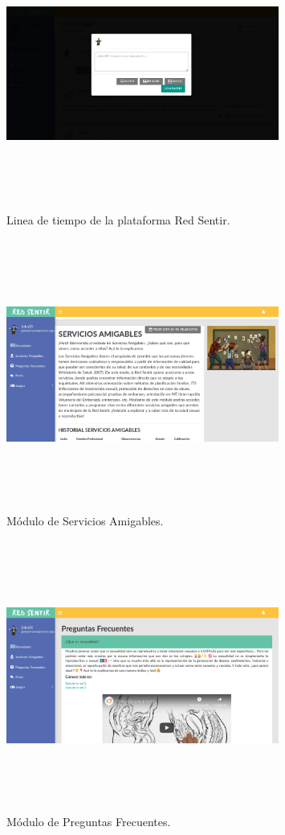 \documentclass[a4paper]{article}
\begin{document}
\begin{figure}[t]
\centering
\includegraphics[width=0.8\textwidth,height=3.5in]{novedades.png}
\caption{Linea de tiempo de la plataforma Red Sentir.}
\label{fig:novedades}
\end{figure}

\begin{figure}[t]
\centering
\includegraphics[width=0.8\textwidth,height=3.5in]{SA.png}
\caption{Módulo de Servicios Amigables.}
\label{fig:SA}
\end{figure}

\begin{figure}[t]
\centering
\includegraphics[width=0.8\textwidth,height=3.5in]{FAQ.png}
\caption{Módulo de Preguntas Frecuentes.}
\label{fig:FAQ}
\end{figure}
\end{document}
